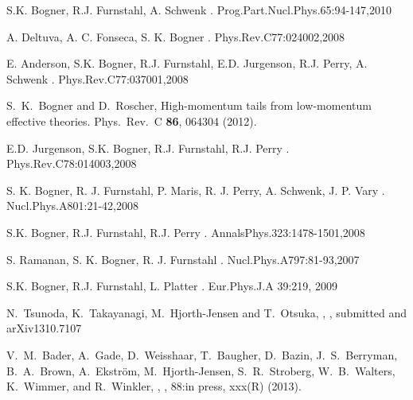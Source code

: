 \begin{thebibliography}{200}
S.K. Bogner, R.J. Furnstahl, A. Schwenk
.
\newblock Prog.Part.Nucl.Phys.65:94-147,2010


A. Deltuva, A. C. Fonseca, S. K. Bogner
.
\newblock  Phys.Rev.C77:024002,2008


E. Anderson, S.K. Bogner, R.J. Furnstahl, E.D. Jurgenson, R.J. Perry, A. Schwenk
.
\newblock  Phys.Rev.C77:037001,2008

 S.~K.~Bogner and D.~Roscher,
\newblock High-momentum tails from low-momentum effective theories.
\newblock  Phys.\ Rev.\ C {\bf 86}, 064304 (2012).

E.D. Jurgenson, S.K. Bogner, R.J. Furnstahl, R.J. Perry
.
\newblock Phys.Rev.C78:014003,2008


S. K. Bogner, R. J. Furnstahl, P. Maris, R. J. Perry, A. Schwenk, J. P. Vary
.
\newblock Nucl.Phys.A801:21-42,2008


S.K. Bogner, R.J. Furnstahl, R.J. Perry
.
\newblock AnnalsPhys.323:1478-1501,2008


S. Ramanan, S. K. Bogner, R. J. Furnstahl
.
\newblock  Nucl.Phys.A797:81-93,2007


S.K. Bogner, R.J. Furnstahl, L. Platter
.
\newblock Eur.Phys.J.A 39:219, 2009


 N.~Tsunoda, K.~Takayanagi, M.~Hjorth-Jensen and T.~Otsuka,
, 
,  submitted and arXiv1310.7107


 V.\ M.\ Bader, A.\ Gade, D.\ Weisshaar, T.\ Baugher, D.\ Bazin, J.\ S.\ Berryman, B.\ A.\ Brown, A.\ Ekstr\"om, M.\ Hjorth-Jensen, S.\ R.\ Stroberg, W.\ B.\ Walters, K.\ Wimmer, and R.\ Winkler, 
, 
,  88:in press, xxx(R) (2013).


\end{thebibliography}
